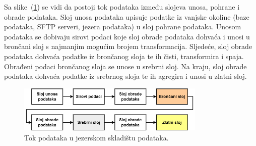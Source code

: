 Sa slike~(\ref{figure:datalakehouse_data_flow}) se vidi da postoji tok podataka
između slojeva unosa, pohrane i obrade podataka. Sloj unosa podataka upisuje
podatke iz vanjske okoline (baze podataka, SFTP serveri, jezera podataka) u sloj
pohrane podataka. Unosom podataka se dobivaju sirovi podaci koje sloj obrade
podataka dohvaća i unosi u brončani sloj s najmanjim mogućim brojem
transformacija. Sljedeće, sloj obrade podataka dohvaća podatke iz brončanog
sloja te ih čisti, transformira i spaja. Obrađeni podaci brončanog sloja se
unose u srebrni sloj. Na kraju, sloj obrade podataka dohvaća podatke iz srebrnog
sloja te ih agregira i unosi u zlatni sloj. 

\begin{figure}
    \centering
    \includegraphics[width=0.8\textwidth]{images/tok_podataka.drawio.png}
    \caption{Tok podataka u jezerskom skladištu podataka.}
    \label{figure:datalakehouse_data_flow}
\end{figure}